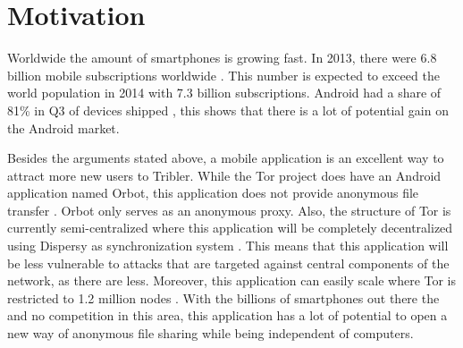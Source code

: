 \section{Motivation}
	\label{scc:motivation}
	Worldwide the amount of smartphones is growing fast. In 2013, there were 6.8 billion mobile subscriptions worldwide \cite{itustatistics}. This number is expected to exceed the world population in 2014 with 7.3 billion subscriptions. Android had a share of 81\% in Q3 of devices shipped \cite{forbesandroidmarket}, this shows that there is a lot of potential gain on the Android market. 

	Besides the arguments stated above, a mobile application is an excellent way to attract more new users to Tribler. While the Tor project does have an Android application named Orbot, this application does not provide anonymous file transfer \cite{tororbot, googleplayorbot}. Orbot only serves as an anonymous proxy. Also, the structure of Tor is currently semi-centralized \cite{jagerman2014fifteen} where this application will be completely decentralized using Dispersy as synchronization system \cite{zeilemaker2013dispersy}. This means that this application will be less vulnerable to attacks that are targeted against central components of the network, as there are less. Moreover, this application can easily scale where Tor is restricted to 1.2 million nodes \cite{mclachlan2009scalable}. With the billions of smartphones out there the and no competition in this area, this application has a lot of potential to open a new way of anonymous file sharing while being independent of computers.
	
